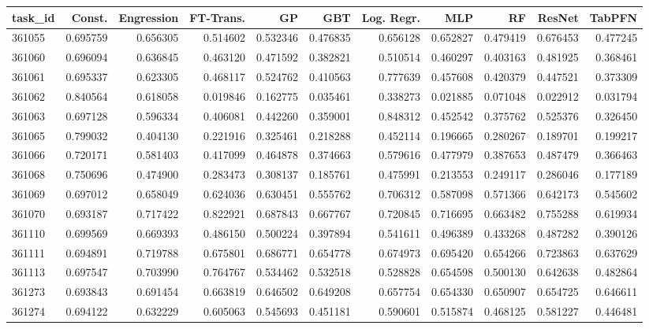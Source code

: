 \begin{tabular}{lrrrrrrrrrr}
\toprule
task\_id & Const. & Engression & FT-Trans. & GP & GBT & Log. Regr. & MLP & RF & ResNet & TabPFN \\
\midrule
361055 & 0.695759 & 0.656305 & 0.514602 & 0.532346 & 0.476835 & 0.656128 & 0.652827 & 0.479419 & 0.676453 & 0.477245 \\
361060 & 0.696094 & 0.636845 & 0.463120 & 0.471592 & 0.382821 & 0.510514 & 0.460297 & 0.403163 & 0.481925 & 0.368461 \\
361061 & 0.695337 & 0.623305 & 0.468117 & 0.524762 & 0.410563 & 0.777639 & 0.457608 & 0.420379 & 0.447521 & 0.373309 \\
361062 & 0.840564 & 0.618058 & 0.019846 & 0.162775 & 0.035461 & 0.338273 & 0.021885 & 0.071048 & 0.022912 & 0.031794 \\
361063 & 0.697128 & 0.596334 & 0.406081 & 0.442260 & 0.359001 & 0.848312 & 0.452542 & 0.375762 & 0.525376 & 0.326450 \\
361065 & 0.799032 & 0.404130 & 0.221916 & 0.325461 & 0.218288 & 0.452114 & 0.196665 & 0.280267 & 0.189701 & 0.199217 \\
361066 & 0.720171 & 0.581403 & 0.417099 & 0.464878 & 0.374663 & 0.579616 & 0.477979 & 0.387653 & 0.487479 & 0.366463 \\
361068 & 0.750696 & 0.474900 & 0.283473 & 0.308137 & 0.185761 & 0.475991 & 0.213553 & 0.249117 & 0.286046 & 0.177189 \\
361069 & 0.697012 & 0.658049 & 0.624036 & 0.630451 & 0.555762 & 0.706312 & 0.587098 & 0.571366 & 0.642173 & 0.545602 \\
361070 & 0.693187 & 0.717422 & 0.822921 & 0.687843 & 0.667767 & 0.720845 & 0.716695 & 0.663482 & 0.755288 & 0.619934 \\
361110 & 0.699569 & 0.669393 & 0.486150 & 0.500224 & 0.397894 & 0.541611 & 0.496389 & 0.433268 & 0.487282 & 0.390126 \\
361111 & 0.694891 & 0.719788 & 0.675801 & 0.686771 & 0.654778 & 0.674973 & 0.695420 & 0.654266 & 0.723863 & 0.637629 \\
361113 & 0.697547 & 0.703990 & 0.764767 & 0.534462 & 0.532518 & 0.528828 & 0.654598 & 0.500130 & 0.642638 & 0.482864 \\
361273 & 0.693843 & 0.691454 & 0.663819 & 0.646502 & 0.649208 & 0.657754 & 0.654330 & 0.650907 & 0.654725 & 0.646611 \\
361274 & 0.694122 & 0.632229 & 0.605063 & 0.545693 & 0.451181 & 0.590601 & 0.515874 & 0.468125 & 0.581227 & 0.446481 \\

\end{tabular}
